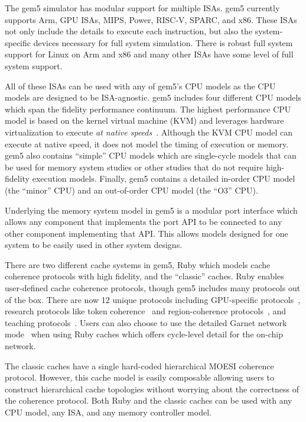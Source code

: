 The gem5 simulator has modular support for multiple ISAs.
gem5 currently supports Arm, GPU ISAs, MIPS, Power, RISC-V, SPARC, and x86.
These ISAs not only include the details to execute each instruction, but also the system-specific devices necessary for full system simulation.
There is robust full system support for Linux on Arm and x86 and many other ISAs have some level of full system support.

All of these ISAs can be used with any of gem5's CPU models as the CPU models are designed to be ISA-agnostic.
gem5 includes four different CPU models which span the fidelity performance continuum.
The highest performance CPU model is based on the kernel virtual machine (KVM) and leverages hardware virtualization to execute \emph{at native speeds}~\cite{full-speed-ahead}.
Although the KVM CPU model can execute at native speed, it does not model the timing of execution or memory.
gem5 also contains ``simple'' CPU models which are single-cycle models that can be used for memory system studies or other studies that do not require high-fidelity execution models.
Finally, gem5 contains a detailed in-order CPU model (the ``minor'' CPU) and an out-of-order CPU model (the ``O3'' CPU).

Underlying the memory system model in gem5 is a modular port interface which allows any component that implements the port API to be connected to any other component implementing that API.
This allows models designed for one system to be easily used in other system designs.

There are two different cache systems in gem5, Ruby which models cache coherence protocols with high fidelity, and the ``classic'' caches.
Ruby enables user-defined cache coherence protocols, though gem5 includes many protocols out of the box.
There are now 12 unique protocols including GPU-specific protocols~\cite{viper}, research protocols like token coherence~\cite{token-coherence} and region-coherence protocols~\cite{Power2012hsc}, and teaching protocols~\cite{coherence-primer}.
Users can also choose to use the detailed Garnet network mode~\cite{garnet-2} when using Ruby caches which offers cycle-level detail for the on-chip network.

The classic caches have a single hard-coded hierarchical MOESI coherence protocol.
However, this cache model is easily composable allowing users to construct hierarchical cache topologies without worrying about the correctness of the coherence protocol.
Both Ruby and the classic caches can be used with any CPU model, any ISA, and any memory controller model.

